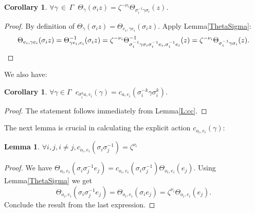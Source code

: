 \documentclass[]{amsart}
\numberwithin{equation}{section}
\newtheorem{lemma}[theorem]{Lemma}
\newtheorem{corollary}[theorem]{Corollary}
\begin{document}
\begin{corollary}\label{ch}
$\forall \gamma \,{\in}\, \Gamma\ $ $\Theta_{\gamma} (\sigma_i z)=\zeta^{-\nu_i}\Theta_{\sigma_i^{-1} \gamma \sigma_i}(z)$.
\end{corollary}
\begin{proof}
By definition of $\Theta_{\gamma}(\sigma_i z) =\Theta_{e_i,\gamma e_i}(\sigma_iz).$  Apply Lemma\;\ref{ThetaSigma}: 
\begin{equation}
\Theta_{e_i,\gamma e_i}(\sigma_iz) = \Theta_{\gamma e_i, e_i}^{-1}(\sigma_i z)=
\zeta^{-\nu_i}\Theta^{-1}_{\sigma_i^{-1}\gamma \sigma_i\sigma_i^{-1}e_i, \sigma_i^{-1}e_i}(z)\\=\zeta^{-\nu_i}\Theta_{\sigma_i^{-1} \gamma \sigma_i}(z).
\end{equation}
 \end{proof}
We also have:
\begin{corollary}
$\forall \gamma\in \Gamma \ $ $c_{\sigma_i^k a,e_i}(\gamma) = c_{a,e_i}(\sigma_i^{-k}\gamma \sigma_i^{k})$.
\end{corollary}
\begin{proof}
The statement follows  immediately from Lemma\;\ref{L:cc}.
\end{proof}
The next lemma is crucial in calculating the explicit action  $c_{o_i, e_i}(\gamma):$
\begin{lemma}\label {explicit}
$\forall i, j, i\neq j,  c_{o_i,e_i}(\sigma_i\sigma_j^{-1})=\zeta^{\nu_i}$
\end{lemma} 
\begin{proof}
We have
$\Theta_{o_i,e_i}(\sigma_i\sigma_j^{-1}e_j)=c_{o_i,e_i}(\sigma_i\sigma_j^{-1})\Theta_{o_i,e_i}(e_j)$.
Using Lemma\;\ref{ThetaSigma} we get
\begin{equation}
\Theta_{o_i,e_i}(\sigma_i\sigma_j^{-1}e_j)=\Theta_{o_i,e_i}(\sigma_i e_j)=\zeta^{\nu_i}\Theta_{o_i,e_i}(e_j).
\end{equation}
Conclude the result from the last expression. 
\end{proof}
\end{document}
